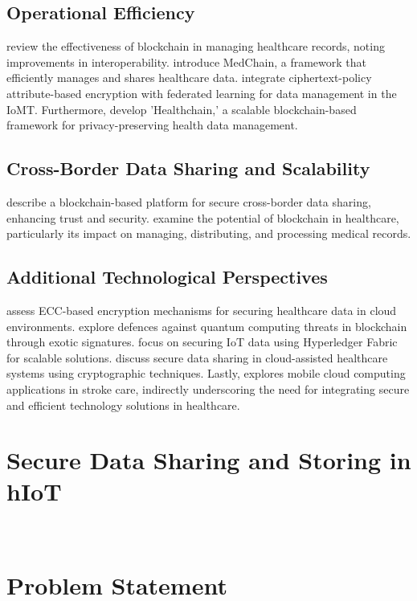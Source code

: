 \documentclass[cic,tc,english]{iiufrgs}
\begin{document}
        \subsection{Operational Efficiency} 
            \citet{Vazirani2019} review the effectiveness of blockchain in managing healthcare records, noting improvements in interoperability. \citet{Shen2019} introduce MedChain, a framework that efficiently manages and shares healthcare data. \citet{Bhansali2022} integrate ciphertext-policy attribute-based encryption with federated learning for data management in the IoMT. Furthermore, \citet{XuJie2019} develop 'Healthchain,' a scalable blockchain-based framework for privacy-preserving health data management.
        
        \subsection{Cross-Border Data Sharing and Scalability} 
            \citet{Rahman2020} describe a blockchain-based platform for secure cross-border data sharing, enhancing trust and security. \citet{Saeed2022} examine the potential of blockchain in healthcare, particularly its impact on managing, distributing, and processing medical records.
        
        \subsection{Additional Technological Perspectives} 
            \citet{Hema2019} assess ECC-based encryption mechanisms for securing healthcare data in cloud environments. \citet{Naz2024} explore defences against quantum computing threats in blockchain through exotic signatures. \citet{Eghmazi2024} focus on securing IoT data using Hyperledger Fabric for scalable solutions. \citet{XuChang2019} discuss secure data sharing in cloud-assisted healthcare systems using cryptographic techniques. Lastly, \citet{Karaca2019} explores mobile cloud computing applications in stroke care, indirectly underscoring the need for integrating secure and efficient technology solutions in healthcare.

    

    \section{Secure Data Sharing and Storing in hIoT}
        \label{sec:securedata}\

    \section{Problem Statement}
        \label{sec:problemstatement}
\end{document}
